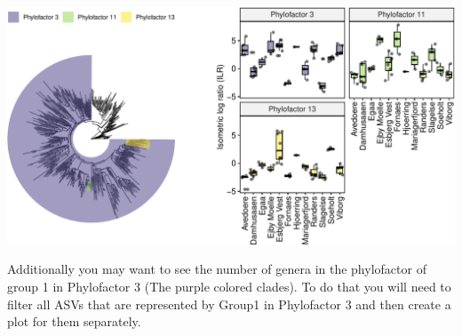 \documentclass[
]{book}
\begin{document}
\includegraphics{gitbook-demo_files/figure-latex/ILRplotcombined-1.pdf}

Additionally you may want to see the number of genera in the phylofactor of group 1 in Phylofactor 3 (The purple colored clades). To do that you will need to filter all ASVs that are represented by Group1 in Phylofactor 3 and then create a plot for them separately.
\end{document}
